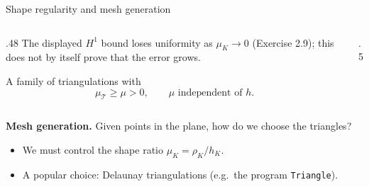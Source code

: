 \begin{frame}{Shape regularity and mesh generation}
    \begin{columns}[c,onlytextwidth]
        \begin{column}{.48\textwidth}
            The displayed $H^1$ bound loses uniformity as $\mu_K\to0$ (Exercise 2.9); this does not by itself prove that the error grows.
            \begin{definition}
                A family of triangulations with
                \[
                    \mu_{\mathcal T} \ge \mu > 0, \qquad \mu \text{ independent of } h.
                \]
            \end{definition}
        \end{column}
        \begin{column}{.5\textwidth}
            \centering
        \end{column}
    \end{columns}
    \bigskip
    \textbf{Mesh generation.} Given points in the plane, how do we choose the triangles?
    \begin{itemize}
        \item We must control the shape ratio $\mu_K = \rho_K/h_K$.
        \item A popular choice: Delaunay triangulations (e.g.\ the program \texttt{Triangle}).
    \end{itemize}
\end{frame}

